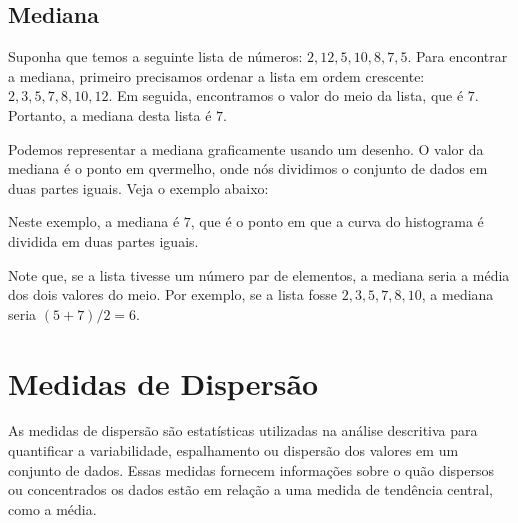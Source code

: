 \subsection{Mediana}

Suponha que temos a seguinte lista de números: $2, 12, 5, 10, 8, 7, 5$. Para encontrar a mediana, primeiro precisamos ordenar a lista em ordem crescente: $2, 3, 5, 7, 8, 10, 12$. Em seguida, encontramos o valor do meio da lista, que é $7$. Portanto, a mediana desta lista é $7$.

Podemos representar a mediana graficamente usando um desenho. O valor da mediana é o ponto em qvermelho, onde nós dividimos o conjunto de dados em duas partes iguais. Veja o exemplo abaixo:

\begin{center}
\end{center}
    

Neste exemplo, a mediana é $7$, que é o ponto em que a curva do histograma é dividida em duas partes iguais.

Note que, se a lista tivesse um número par de elementos, a mediana seria a média dos dois valores do meio. Por exemplo, se a lista fosse $2, 3, 5, 7, 8, 10$, a mediana seria $(5+7)/2 = 6$.

\section{Medidas de Dispersão}

As medidas de dispersão são estatísticas utilizadas na análise descritiva para quantificar a variabilidade, espalhamento ou dispersão dos valores em um conjunto de dados. Essas medidas fornecem informações sobre o quão dispersos ou concentrados os dados estão em relação a uma medida de tendência central, como a média.

